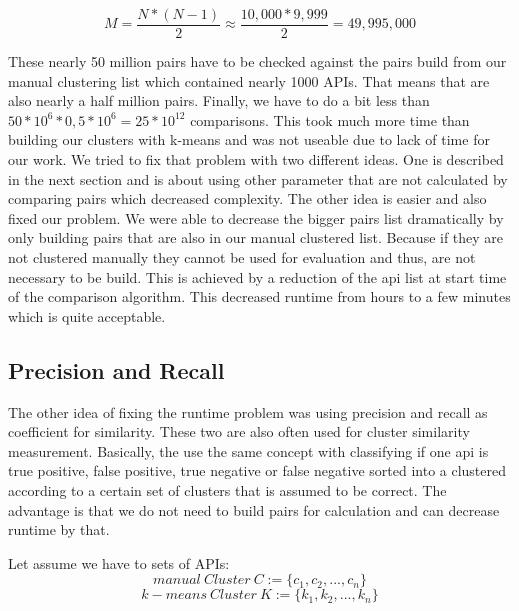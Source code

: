 \documentclass[a4paper]{IEEEtran}
\begin{document}
\begin{equation*}
M= \frac{N*(N-1)}{2}\approx \frac{10,000*9,999}{2}=49,995,000
\end{equation*}

These nearly 50 million pairs have to be checked against the pairs build from our manual clustering list which contained nearly 1000 APIs. That means that are also nearly a half million pairs. Finally, we have to do a bit less than $50*10^6*0,5*10^6=25*10^{12}$ comparisons. This took much more time than building our clusters with k-means and was not useable due to lack of time for our work.
We tried to fix that problem with two different ideas. One is described in the next section and is about using other parameter that are not calculated by comparing pairs which decreased complexity. The other idea is easier and also fixed our problem. We were able to decrease the bigger pairs list dramatically by only building pairs that are also in our manual clustered list. Because if they are not clustered manually they cannot be used for evaluation and thus, are not necessary to be build. This is achieved by a reduction of the api list at start time of the comparison algorithm. This decreased runtime from hours to a few minutes which is quite acceptable.

\subsection{Precision and Recall}
The other idea of fixing the runtime problem was using precision and recall as coefficient for similarity. These two are also often used for cluster similarity measurement. Basically, the use the same concept with classifying if one api is true positive, false positive, true negative or false negative sorted into a clustered according to a certain set of clusters that is assumed to be correct. The advantage is that we do not need to build pairs for calculation and can decrease runtime by that. \cite{powers2011evaluation}

Let assume we have to sets of APIs:
\begin{equation*}
manual~Cluster~C := \{ c_1,c_2,...,c_n \}
\end{equation*}
\begin{equation*}
k-means~Cluster~K := \{ k_1,k_2,...,k_n \}
\end{equation*}
\end{document}
